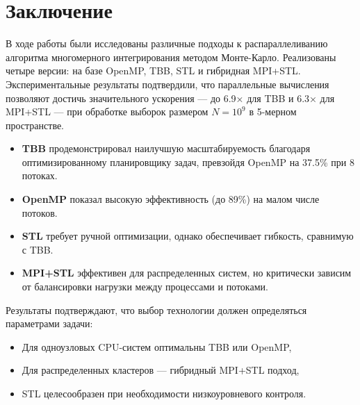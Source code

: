 \documentclass[a4paper,12pt]{article}
\begin{document}
\newpage

\section{Заключение}

В ходе работы были исследованы различные подходы к распараллеливанию алгоритма многомерного интегрирования методом Монте-Карло. Реализованы четыре версии: на базе OpenMP, TBB, STL и гибридная MPI+STL. Экспериментальные результаты подтвердили, что параллельные вычисления позволяют достичь значительного ускорения — до 6.9× для TBB и 6.3× для MPI+STL — при обработке выборок размером \( N = 10^9 \) в 5-мерном пространстве.

\begin{itemize}
\item \textbf{TBB} продемонстрировал наилучшую масштабируемость благодаря оптимизированному планировщику задач, превзойдя OpenMP на 37.5\% при 8 потоках.
\item \textbf{OpenMP} показал высокую эффективность (до 89\%) на малом числе потоков.
\item \textbf{STL} требует ручной оптимизации, однако обеспечивает гибкость, сравнимую с TBB.
\item \textbf{MPI+STL} эффективен для распределенных систем, но критически зависим от балансировки нагрузки между процессами и потоками.
\end{itemize}

Результаты подтверждают, что выбор технологии должен определяться параметрами задачи:
\begin{itemize}
\item Для одноузловых CPU-систем оптимальны TBB или OpenMP,
\item Для распределенных кластеров — гибридный MPI+STL подход,
\item STL целесообразен при необходимости низкоуровневого контроля.
\end{itemize}

\newpage
\end{document}
